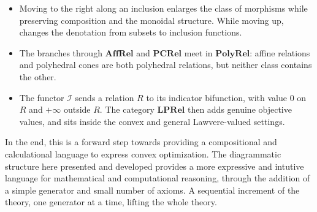 

\begin{itemize}
    \item Moving to the right along an inclusion enlarges the
          class of morphisms while preserving composition and the monoidal
          structure. While moving up, changes the denotation from subsets
          to inclusion functions.
    \item The branches through $\mathbf{AffRel}$ and $\mathbf{PCRel}$ meet
          in $\mathbf{PolyRel}$: affine relations and polyhedral cones are
          both polyhedral relations, but neither class contains the other.
    \item The functor $\mathcal I$ sends a relation $R$ to its indicator
          bifunction, with value $0$ on $R$ and $+\infty$ outside $R$.
          The category $\mathbf{LPRel}$ then adds genuine objective values,
          and sits inside the convex and general Lawvere-valued settings.
\end{itemize}

In the end, this is a forward step towards providing a compositional and
calculational language to express convex optimization.
The diagrammatic structure here presented and developed provides a more expressive
and intutive language for mathematical and computational reasoning,
through the addition of a simple generator and small number of axioms.
A sequential increment of the theory, one generator at a time, lifting the whole theory.
